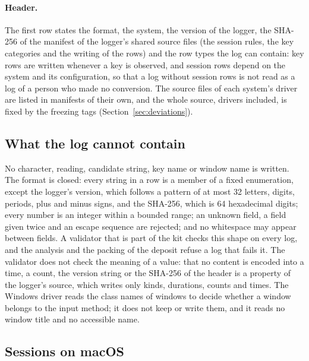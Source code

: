 \paragraph{Header.} The first row states the format, the system, the version of the logger, the SHA-256 of the
manifest of the logger's shared source files (the session rules, the key categories and the writing of the rows) and
the row types the log can contain: key rows are written whenever a key is observed, and session rows depend on the
system and its configuration, so that a log without session rows is not read as a log of a person who made no
conversion. The source files of each system's driver are listed in manifests of their own, and the whole source,
drivers included, is fixed by the freezing tags (Section~\ref{sec:deviations}).

\subsection{What the log cannot contain}
\label{sec:logger-content}

No character, reading, candidate string, key name or window name is written. The format is closed: every string in a
row is a member of a fixed enumeration, except the logger's version, which follows a pattern of at most 32 letters,
digits, periods, plus and minus signs, and the SHA-256, which is 64 hexadecimal digits; every number is an integer
within a bounded range; an unknown field, a field given twice and an escape sequence are rejected; and no whitespace
may appear between fields. A validator that is part of the kit
checks this shape on every log, and the analysis and the packing of the deposit refuse a log that fails it. The
validator does not check the meaning of a value: that no content is encoded into a time, a count, the version string or
the SHA-256 of the header is a property of the logger's source, which writes only kinds, durations, counts and times.
The Windows driver reads the class names of windows to decide whether a window belongs to the input method; it does
not keep or write them, and it reads no window title and no accessible name.

\subsection{Sessions on macOS}
\label{sec:logger-macos}

